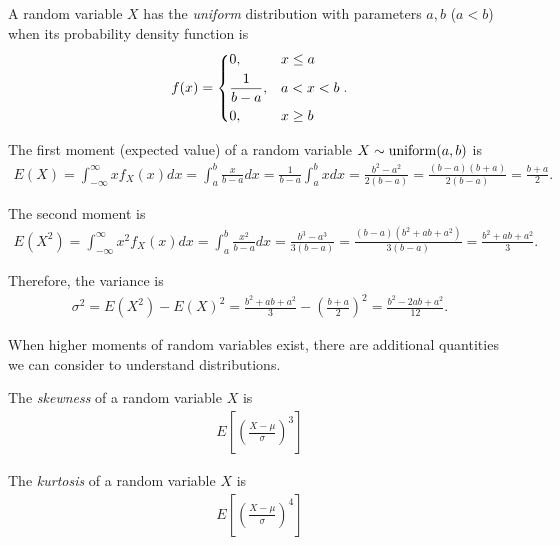 \begin{defn}
    A random variable $X$ has the \emph{uniform} distribution with parameters $a, b$ ($a < b$) when its probability density function is
    \begin{align}
        f(x) = \begin{dcases}
            0, & x \leq a \\
            \frac{1}{b - a}, & a < x < b \\
            0, & x \geq b
        \end{dcases}.
    \end{align}
\end{defn}

\begin{defn}
    The first moment (expected value) of a random variable $X \sim \mathrm{uniform}(a, b)$ is
    \begin{align*}
        E(X) = \int_{-\infty}^{\infty}xf_X(x)dx = \int_{a}^{b}\frac{x}{b - a}dx = \frac{1}{b - a}\int_{a}^{b}xdx = \frac{b^2 - a^2}{2(b - a)} = \frac{(b - a)(b + a)}{2(b - a)} = \frac{b+a}{2}.
    \end{align*}

    The second moment is
    \begin{align*}
        E(X^2) = \int_{-\infty}^{\infty}x^2f_X(x)dx = \int_{a}^{b}\frac{x^2}{b - a}dx = \frac{b^3 - a^3}{3(b - a)} = \frac{(b-a)(b^2 + ab + a^2)}{3(b - a)} = \frac{b^2+ab+a^2}{3}.
    \end{align*}

    Therefore, the variance is
    \begin{align*}
        \sigma^2 = E(X^2) - E(X)^2 = \frac{b^2+ab+a^2}{3} - \left(\frac{b+a}{2}\right)^2 = \frac{b^2-2ab+a^2}{12}.
    \end{align*}
\end{defn}

\begin{rmk}
    When higher moments of random variables exist, there are additional quantities we can consider to understand distributions.
\end{rmk}

\begin{defn}
    The \emph{skewness} of a random variable $X$ is
    \begin{align*}
        E\left[\left(\frac{X-\mu}{\sigma}\right)^3\right]
    \end{align*}
\end{defn}

\begin{defn}
    The \emph{kurtosis} of a random variable $X$ is
    \begin{align*}
        E\left[\left(\frac{X-\mu}{\sigma}\right)^4\right]
    \end{align*}
\end{defn}

